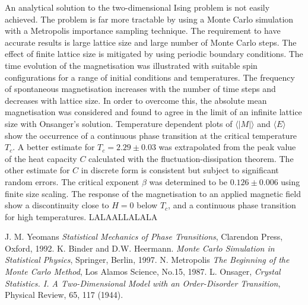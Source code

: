 \documentclass[a4paper]{article}
\begin{document}
An analytical solution to the two-dimensional Ising problem is not easily achieved. The problem is far more tractable by using a Monte Carlo simulation with a Metropolis importance sampling technique. The requirement to have accurate results is large lattice size and large number of Monte Carlo steps. The effect of finite lattice size is mitigated by using periodic boundary conditions. The time evolution of the magnetisation was illustrated with suitable spin configurations for a range of initial conditions and temperatures. The frequency of spontaneous magnetisation increases with the number of time steps and decreases with lattice size. In order to overcome this, the absolute mean magnetisation was considered and found to agree in the limit of an infinite lattice size with Onsanger's solution. Temperature dependent plots of $\langle |M| \rangle$ and $\langle E \rangle$ show the occurrence of a continuous phase transition at the critical temperature $T_c$. A better estimate for $T_c = 2.29 \pm 0.03$ was extrapolated from the peak value of the heat capacity $C$ calculated with the fluctuation-dissipation theorem. The other estimate for $C$ in discrete form is consistent but subject to significant random errors. The critical exponent $\beta$ was determined to be $0.126 \pm 0.006$ using finite size scaling. The response of the magnetisation to an applied magnetic field show a discontinuity close to $H = 0$ below $T_c$, and a continuous phase transition for high temperatures. LALAALLALALA

\begin{thebibliography}{3}

 J. M. Yeomans \emph{Statistical Mechanics of Phase Transitions}, Clarendon Press, Oxford, 1992.
  K. Binder and D.W. Heermann. \emph{Monte Carlo Simulation in Statistical Physics}, Springer, Berlin, 1997.
  N. Metropolis \emph{The Beginning of the Monte Carlo Method}, Los Alamos Science, No.15, 1987. 
  L. Onsager, \emph{Crystal Statistics. I. A Two-Dimensional Model with an Order-Disorder Transition}, Physical Review, 65, 117 (1944).
 
\end{thebibliography}

\appendix

\newpage
\end{document}
